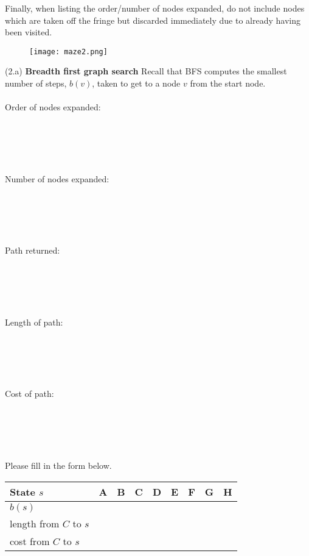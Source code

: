 \documentclass{article}
\begin{document}
\noindent Finally, when listing the order/number of nodes expanded, do not include nodes which are taken off the fringe but discarded immediately due to already having been visited.


\begin{figure}[h]
\centering
\texttt{[image: maze2.png]}
\end{figure}

\newpage

\noindent (2.a) \textbf{Breadth first graph search}
Recall that BFS computes the smallest number of steps, $b(v)$, taken to get to a node $v$ from the start node.\\
~\\
Order of nodes expanded:\\
~\\
~\\
~\\
~\\
~\\
Number of nodes expanded:\\
~\\
~\\
~\\
~\\
~\\
Path returned:\\
~\\
~\\
~\\
~\\
~\\
Length of path:\\
~\\
~\\
~\\
~\\
~\\
Cost of path:\\
~\\
~\\
~\\
~\\
~\\
Please fill in the form below.
\renewcommand\arraystretch{1.5}
\begin{table}[tbh!]
\begin{center}
    \begin{tabular}{|p{2cm}| p{1cm}| p{1cm} | p{1cm}| p{1cm} | p{1cm}| p{1cm} | p{1cm}| p{1cm}|}
\hline
    State $s$  & A & B & C & D & E & F & G & H \\ \hline
    $b(s)$ &   &   &   &  &   &   &   &  \\\hline
    length from $C$ to $s$  &   &   &   &  &   &   &   &  \\\hline
    cost from $C$ to $s$ &   &   &   &  &   &   &   &  \\
\hline
\end{tabular}
\end{center}
\end{table}
\end{document}
